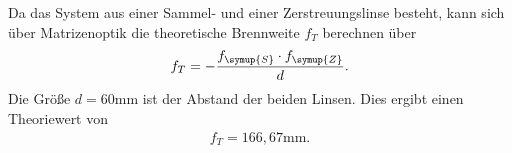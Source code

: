 Da das System aus einer Sammel- und einer Zerstreuungslinse besteht, kann sich über Matrizenoptik die theoretische Brennweite $f_T$ berechnen über
\begin{align*}
f_T = -\frac{f_{\symup{S}}\cdot f_{\symup{Z}}}{d}.
\end{align*}
Die Größe $d = 60 \si{\milli\meter}$ ist der Abstand der beiden Linsen.
Dies ergibt einen Theoriewert von 
\begin{align*}
f_T = 166,67 \si{\milli\meter}.
\end{align*}
